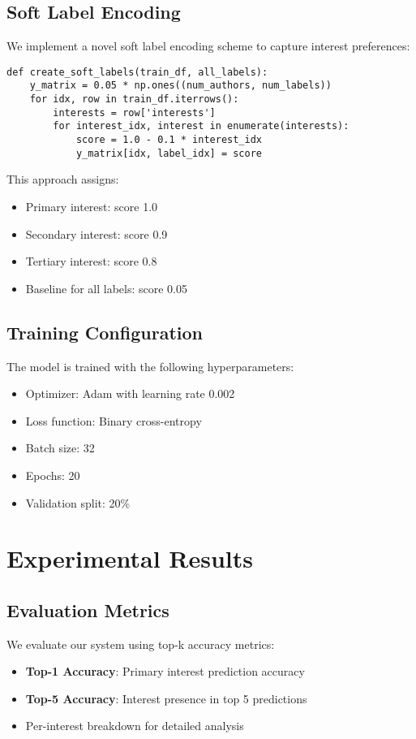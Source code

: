 \documentclass[preprint,12pt]{elsarticle}
\begin{document}
\subsection{Soft Label Encoding}
We implement a novel soft label encoding scheme to capture interest preferences:

\begin{verbatim}
def create_soft_labels(train_df, all_labels):
    y_matrix = 0.05 * np.ones((num_authors, num_labels))
    for idx, row in train_df.iterrows():
        interests = row['interests']
        for interest_idx, interest in enumerate(interests):
            score = 1.0 - 0.1 * interest_idx
            y_matrix[idx, label_idx] = score
\end{verbatim}

This approach assigns:
\begin{itemize}
    \item Primary interest: score 1.0
    \item Secondary interest: score 0.9
    \item Tertiary interest: score 0.8
    \item Baseline for all labels: score 0.05
\end{itemize}

\subsection{Training Configuration}
The model is trained with the following hyperparameters:
\begin{itemize}
    \item Optimizer: Adam with learning rate 0.002
    \item Loss function: Binary cross-entropy
    \item Batch size: 32
    \item Epochs: 20
    \item Validation split: 20\%
\end{itemize}

\section{Experimental Results}
\label{sec4}

\subsection{Evaluation Metrics}
We evaluate our system using top-k accuracy metrics:
\begin{itemize}
    \item \textbf{Top-1 Accuracy}: Primary interest prediction accuracy
    \item \textbf{Top-5 Accuracy}: Interest presence in top 5 predictions
    \item Per-interest breakdown for detailed analysis
\end{itemize}
\end{document}
